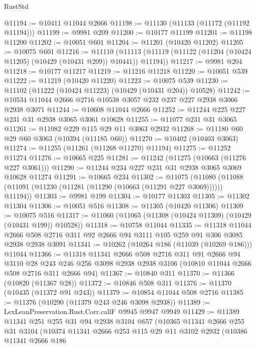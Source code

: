 \begin{lexlean}{RustStd}
\begin{coremodule}
@11194 := @10411 @11044 @2666
@11198 := @11130 (@11133 (@11172 (@11192 @11194)))
@11199 := @9981 @209
@11200 := @10177 @11199
@11201 := @11198 @11200
@11202 := @10051 @601
@11204 := @11201 (@10420 @11202)
@11205 := @10075 @601
@11216 := @11110
    (@11113 (@11119 (@11122 (@11204 (@10424 @11205) (@10429 (@10431 @209)) @10441)) @11194))
@11217 := @9981 @204
@11218 := @10177 @11217
@11219 := @11216 @11218
@11220 := @10051 @539
@11222 := @11219 (@10420 @11220)
@11223 := @10075 @539
@11230 := @11102 (@11222 (@10424 @11223) (@10429 (@10431 @204)) @10528)
@11242 := @10534 @11044 @2666 @2716 @10538 @3057 @232 @237 @227 @2938 @3066 @2938 @3071
@11244 := @10608 @11044 @2666
@11252 := @11244 @225 @227 @231 @31 @2938 @3065 @3061 @10628
@11255 := @11077 @231 @31 @3065
@11261 := @11082 @229 @115 @29 @11 @3063 @2932
@11268 := @11180 @60 @29 @60 @3063 (@10394 (@11185 @60))
@11270 := @10402 (@10403 @3063)
@11274 := @11255 (@11261 (@11268 @11270) @11194)
@11275 := @11252 @11274
@11276 := @10665 @225
@11281 := @11242 (@11275 (@10663 (@11276 @227 @3061)))
@11290 := @11244 @234 @227 @231 @31 @2938 @3065 @3069 @10628 @11274
@11291 := @10665 @234
@11302 := @11075
    (@11080 (@11088 (@11091 (@11230 (@11281 (@11290 (@10663 (@11291 @227 @3069)))))) @11194))
@11303 := @9981 @199
@11304 := @10177 @11303
@11305 := @11302 @11304
@11306 := @10051 @516
@11308 := @11305 (@10420 @11306)
@11309 := @10075 @516
@11317 := @11060 (@11065 (@11308 (@10424 @11309) (@10429 (@10431 @199)) @10528))
@11318 := @10758 @11044
@11335 := @11318
    @11044
    @2666
    @508
    @2716
    @311
    @92
    @2666
    @94
    @3111
    @105
    @259
    @91
    @306
    @3085
    @2938
    @2938
    @3091
@11341 := @10262 (@10264 @186 (@11039 (@10269 @186))) @11044
@11366 := @11318
    @11341
    @2666
    @508
    @2716
    @311
    @91
    @2666
    @94
    @3110
    @28
    @243
    @246
    @256
    @3098
    @2938
    @2938
    @3106
    (@10810 @11044 @2666 @508 @2716 @311 @2666 @94)
@11367 := @10840 @311
@11370 := @11366 (@10820 (@11367 @28))
@11372 := @10846 @508 @311
@11376 := @11370 (@10435 (@11372 @91 @243))
@11379 := @10854 @11044 @508 @2716
@11385 := @11376 (@10290 (@11379 @243 @246 @3098 @2938))
@11389 := LexLeanPreservation.Rust.Corr.callF @9945 @9947 @9949
@11429 := @11389
    @11341
    @251
    @255
    @31
    @94
    @2938
    @3104
    @657
    (@10365
      @11341
      @2666
      @255
      @31
      @3104
      (@10374
        @11341
        @2666
        @253
        @115
        @29
        @11
        @3102
        @2932
        (@10386
          @11341
          @2666
          @186

\end{coremodule}
\end{lexlean}
